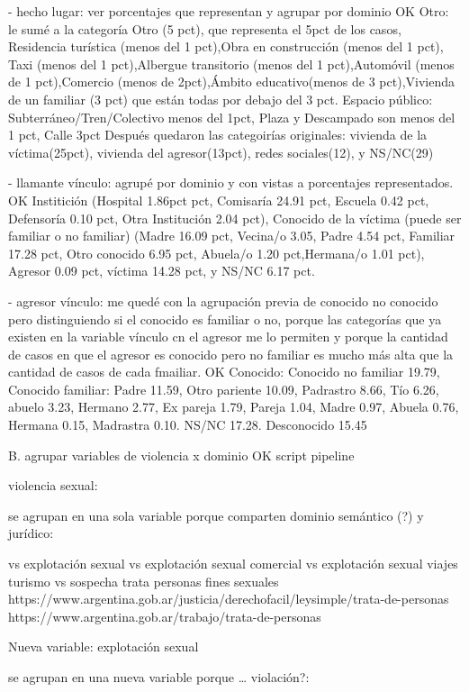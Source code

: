 \documentclass[10pt, spanish]{article}
\begin{document}
- hecho lugar: ver porcentajes que representan y agrupar por dominio OK
Otro: le sumé a la categoría Otro (5 pct), que representa el 5pct de los casos,  Residencia turística (menos del 1 pct),Obra en construcción (menos del 1 pct), Taxi (menos del 1 pct),Albergue transitorio (menos del 1 pct),Automóvil (menos de 1 pct),Comercio (menos de 2pct),Ámbito educativo(menos de 3 pct),Vivienda de un familiar (3 pct) que están todas por debajo del 3 pct.
Espacio público: Subterráneo/Tren/Colectivo menos del 1pct, Plaza y Descampado son menos del 1 pct, Calle 3pct
Después quedaron las categoirías originales: vivienda de la víctima(25pct), vivienda del agresor(13pct), redes sociales(12), y NS/NC(29)


- llamante vínculo: agrupé por dominio y con vistas a porcentajes representados. OK
 Institición (Hospital 1.86pct pct, Comisaría 24.91 pct, Escuela 0.42 pct, Defensoría 0.10 pct, Otra Institución 2.04 pct), Conocido de la víctima (puede ser familiar o no familiar) (Madre 16.09 pct, Vecina/o 3.05, Padre 4.54 pct, Familiar 17.28 pct, Otro conocido 6.95 pct, Abuela/o 1.20 pct,Hermana/o 1.01 pct), Agresor 0.09 pct, víctima 14.28 pct, y NS/NC 6.17 pct.

- agresor vínculo: me quedé con la agrupación previa de conocido no conocido pero distinguiendo si el conocido es familiar o no, porque las categorías que ya existen en la variable vínculo cn el agresor me lo permiten y porque la cantidad de casos en que el agresor es conocido pero no familiar es mucho más alta que la cantidad de casos de cada fmailiar. OK
Conocido: Conocido no familiar 19.79, Conocido familiar: Padre 11.59, Otro pariente 10.09, Padrastro 8.66, Tío 6.26, abuelo 3.23, Hermano 2.77, Ex pareja 1.79, Pareja 1.04, Madre 0.97, Abuela 0.76, Hermana 0.15, Madrastra 0.10. NS/NC 17.28. Desconocido 15.45  


B. agrupar variables de violencia x dominio OK script pipeline 

violencia sexual:

se agrupan en una sola variable porque comparten dominio semántico (?) y jurídico:

vs explotación sexual
vs explotación sexual comercial
vs explotación sexual viajes turismo
vs sospecha trata personas fines sexuales
https://www.argentina.gob.ar/justicia/derechofacil/leysimple/trata-de-personas
https://www.argentina.gob.ar/trabajo/trata-de-personas

Nueva variable: explotación sexual

se agrupan en una nueva variable porque … violación?:
\end{document}
